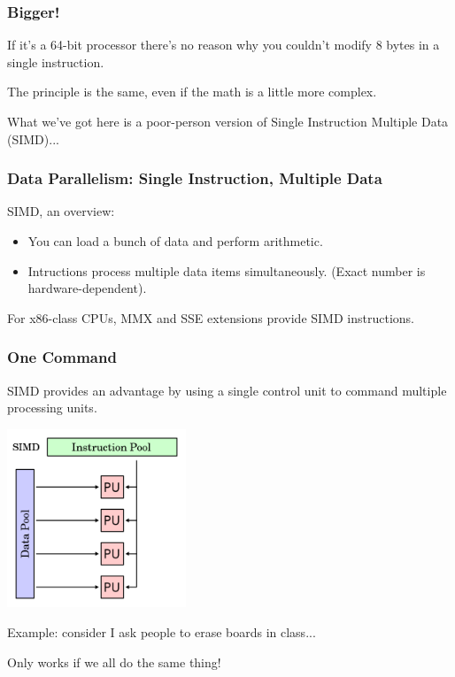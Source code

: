 \begin{frame}
\frametitle{Bigger!}

If it's a 64-bit processor there's no reason why you couldn't modify 8 bytes in a single instruction. 

The principle is the same, even if the math is a little more complex.

What we've got here is a poor-person version of Single Instruction Multiple Data (SIMD)...

\end{frame}



\begin{frame}
  \frametitle{Data Parallelism: Single Instruction, Multiple Data}

  
   SIMD, an overview:
    \begin{itemize}
    \item You can load a bunch of data and perform 
      arithmetic.
    \item Intructions process multiple data items simultaneously.
      (Exact number is hardware-dependent).
    \end{itemize}
    For x86-class CPUs, MMX and SSE extensions provide SIMD instructions.
  
\end{frame}


\begin{frame}
\frametitle{One Command}

SIMD provides an advantage by using a single control unit to command multiple processing units.


\begin{center}
	\includegraphics[width=0.4\textwidth]{images/simd.png}
\end{center}

Example: consider I ask people to erase boards in class...

Only works if we all do the same thing!

\end{frame}


